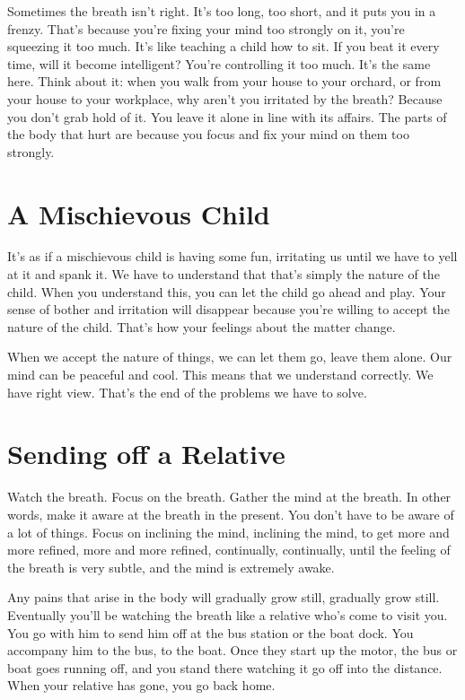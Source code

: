 Sometimes the breath isn't right. It's too long, too short, and it puts you in a frenzy. That's because you're fixing your mind too strongly on it, you're squeezing it too much. It's like teaching a child how to sit. If you beat it every time, will it become intelligent? You're controlling it too much. It's the same here. Think about it: when you walk from your house to your orchard, or from your house to your workplace, why aren't you irritated by the breath? Because you don't grab hold of it. You leave it alone in line with its affairs. The parts of the body that hurt are because you focus and fix your mind on them too strongly.

\section{A Mischievous Child}

\enlargethispage{\baselineskip}
It's as if a mischievous child is having some fun, irritating us until we have to yell at it and spank it. We have to understand that that's simply the nature of the child. When you understand this, you can let the child go ahead and play. Your sense of bother and irritation will disappear because you're willing to accept the nature of the child. That's how your feelings about the matter change.

When we accept the nature of things, we can let them go, leave them alone. Our mind can be peaceful and cool. This means that we understand correctly. We have right view. That's the end of the problems we have to solve.

\clearpage

\section{Sending off a Relative}

Watch the breath. Focus on the breath. Gather the mind at the breath. In other words, make it aware at the breath in the present. You don't have to be aware of a lot of things. Focus on inclining the mind, inclining the mind, to get more and more refined, more and more refined, continually, continually, until the feeling of the breath is very subtle, and the mind is extremely awake.

Any pains that arise in the body will gradually grow still, gradually grow still. Eventually you'll be watching the breath like a relative who's come to visit you. You go with him to send him off at the bus station or the boat dock. You accompany him to the bus, to the boat. Once they start up the motor, the bus or boat goes running off, and you stand there watching it go off into the distance. When your relative has gone, you go back home. 

